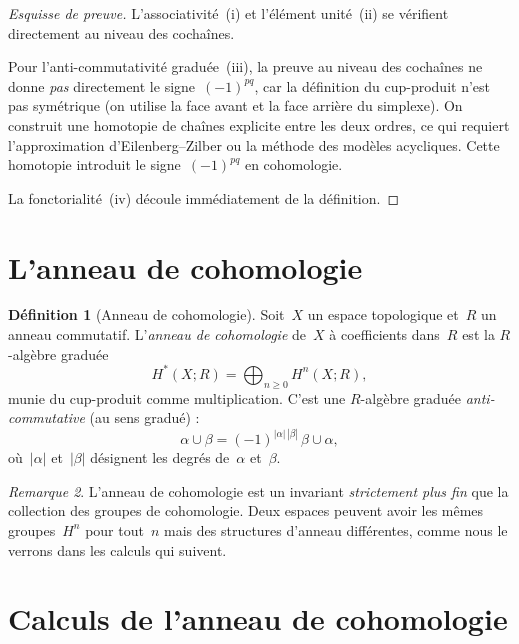 \documentclass[12pt,a4paper,openany]{book}
\theoremstyle{definition}
\newtheorem{definition}{Définition}[chapter]
\theoremstyle{plain}
\theoremstyle{remark}
\newtheorem{remarque}[definition]{Remarque}
\begin{document}
\begin{proof}[Esquisse de preuve]
L'associativité~(i) et l'élément unité~(ii) se vérifient directement au niveau des
cochaînes.

Pour l'anti-commutativité graduée~(iii), la preuve au niveau des cochaînes ne donne
\emph{pas} directement le signe~$(-1)^{pq}$, car la définition du cup-produit n'est
pas symétrique (on utilise la face avant et la face arrière du simplexe). On construit
une homotopie de chaînes explicite entre les deux ordres, ce qui requiert l'approximation
d'Eilenberg--Zilber ou la méthode des modèles
acycliques. Cette homotopie introduit le signe~$(-1)^{pq}$
en cohomologie.

La fonctorialité~(iv) découle immédiatement de la définition.
\end{proof}

\section{L'anneau de cohomologie}\label{sec:anneau-cohomologie}

\begin{definition}[Anneau de cohomologie]\label{def:anneau-cohomologie}
Soit~$X$ un espace topologique et~$R$ un anneau commutatif. L'\emph{anneau de cohomologie}
de~$X$ à coefficients dans~$R$ est la $R$-algèbre graduée
\[
  H^*(X; R) = \bigoplus_{n \geqslant 0} H^n(X; R),
\]
munie du cup-produit comme multiplication. C'est une $R$-algèbre graduée
\emph{anti-commutative} (au sens gradué) :
\[
  \alpha \cup \beta = (-1)^{|\alpha|\,|\beta|}\, \beta \cup \alpha,
\]
où~$|\alpha|$ et~$|\beta|$ désignent les degrés de~$\alpha$ et~$\beta$.
\end{definition}

\begin{remarque}\label{rem:anneau-vs-groupe}
L'anneau de cohomologie est un invariant \emph{strictement plus fin} que la collection
des groupes de cohomologie. Deux espaces peuvent avoir les mêmes groupes~$H^n$ pour
tout~$n$ mais des structures d'anneau différentes, comme nous le verrons dans les calculs
qui suivent.
\end{remarque}

\section{Calculs de l'anneau de cohomologie}\label{sec:calculs-cohomologie}
\end{document}
